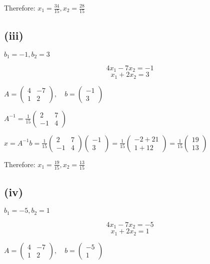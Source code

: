 \documentclass[12pt]{article}
\begin{document}
Therefore: $x_1 = \frac{34}{15}, x_2 = \frac{28}{15}$

\subsection*{(iii)} $b_1 = -1, b_2 = 3$

\[
	4x_1 - 7x_2 = -1
\]
\[
	x_1 + 2x_2 = 3
\]

$A = \begin{pmatrix}
	4 & -7 \\
	1 & 2
\end{pmatrix}, \quad b = \begin{pmatrix}
	-1 \\
	3
\end{pmatrix}$

$A^{-1} = \frac{1}{15}\begin{pmatrix}
	2 & 7 \\
	-1 & 4
\end{pmatrix}$

$x = A^{-1}b = \frac{1}{15}\begin{pmatrix}
	2 & 7 \\
	-1 & 4
\end{pmatrix}\begin{pmatrix}
	-1 \\
	3
\end{pmatrix} = \frac{1}{15}\begin{pmatrix}
	-2 + 21 \\
	1 + 12
\end{pmatrix} = \frac{1}{15}\begin{pmatrix}
	19 \\
	13
\end{pmatrix}$

Therefore: $x_1 = \frac{19}{15}, x_2 = \frac{13}{15}$

\subsection*{(iv)} $b_1 = -5, b_2 = 1$

\[
	4x_1 - 7x_2 = -5
\]
\[
	x_1 + 2x_2 = 1
\]

$A = \begin{pmatrix}
	4 & -7 \\
	1 & 2
\end{pmatrix}, \quad b = \begin{pmatrix}
	-5 \\
	1
\end{pmatrix}$
\end{document}

